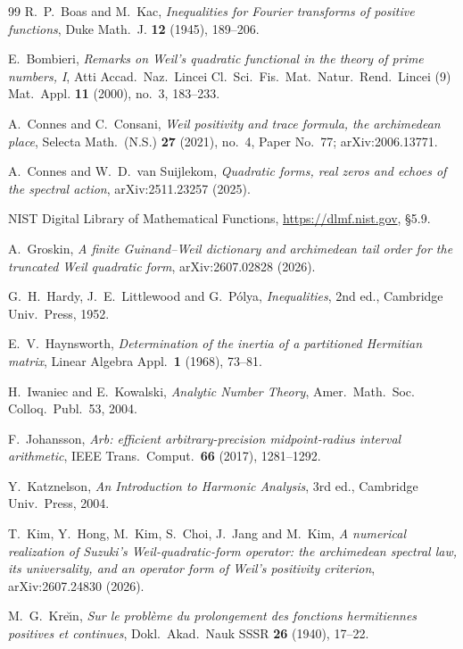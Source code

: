 \documentclass[11pt]{amsart}
\theoremstyle{definition}
\theoremstyle{remark}
\begin{document}
\begin{thebibliography}{99}
 R.~P.~Boas and M.~Kac, \emph{Inequalities for Fourier transforms of positive
functions}, Duke Math.~J. \textbf{12} (1945), 189--206.

 E.~Bombieri, \emph{Remarks on Weil's quadratic functional in the theory of
prime numbers, I}, Atti Accad.~Naz.~Lincei Cl.~Sci.~Fis.~Mat.~Natur.~Rend.~Lincei (9) Mat.~Appl.
\textbf{11} (2000), no.~3, 183--233.

 A.~Connes and C.~Consani, \emph{Weil positivity and trace formula, the archimedean place}, Selecta Math.\ (N.S.) \textbf{27} (2021), no.~4, Paper No.~77; arXiv:2006.13771.

 A.~Connes and W.~D.~van Suijlekom, \emph{Quadratic forms, real zeros and echoes of the spectral action}, arXiv:2511.23257 (2025).

 NIST Digital Library of Mathematical Functions, \url{https://dlmf.nist.gov}, \S5.9.

 A.~Groskin, \emph{A finite Guinand--Weil dictionary and archimedean tail
order for the truncated Weil quadratic form}, arXiv:2607.02828 (2026).

 G.~H.~Hardy, J.~E.~Littlewood and G.~P\'olya, \emph{Inequalities}, 2nd ed., Cambridge Univ.~Press, 1952.

 E.~V.~Haynsworth, \emph{Determination of the inertia of a partitioned Hermitian
matrix}, Linear Algebra Appl.\ \textbf{1} (1968), 73--81.

 H.~Iwaniec and E.~Kowalski, \emph{Analytic Number Theory}, Amer.~Math.~Soc.
Colloq.~Publ.~53, 2004.

 F.~Johansson, \emph{Arb: efficient arbitrary-precision midpoint-radius interval
arithmetic}, IEEE Trans.\ Comput.\ \textbf{66} (2017), 1281--1292.

 Y.~Katznelson, \emph{An Introduction to Harmonic Analysis}, 3rd ed.,
Cambridge Univ.~Press, 2004.

 T.~Kim, Y.~Hong, M.~Kim, S.~Choi, J.~Jang and M.~Kim, \emph{A numerical realization of Suzuki's Weil-quadratic-form operator: the archimedean spectral law, its universality, and an operator form of Weil's positivity criterion}, arXiv:2607.24830 (2026).

 M.~G.~Kre\u{\i}n, \emph{Sur le probl\`eme du prolongement des fonctions
hermitiennes positives et continues}, Dokl.~Akad.~Nauk SSSR \textbf{26} (1940), 17--22.


\end{thebibliography}
\end{document}
